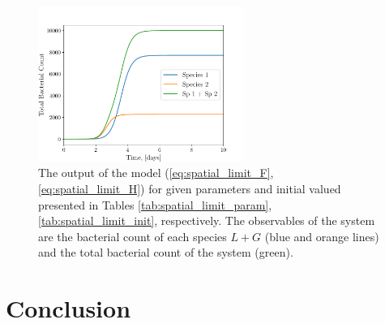 \documentclass[10pt,A4paper]{article}
\begin{document}
%
\begin{figure}[H]
    \begin{center}
    \includegraphics[width=0.6\textwidth]{Figures/pool_model_spatial.pdf}
    \caption{
        The output of the model (\ref{eq:spatial_limit_F}, \ref{eq:spatial_limit_H}) for given parameters and initial valued presented in Tables \ref{tab:spatial_limit_param}, \ref{tab:spatial_limit_init}, respectively.
        The observables of the system are the bacterial count of each species $L+G$ (blue and orange lines) and the total bacterial count of the system (green).
    }
    \label{fig:spatial_limit_plot1}
    \end{center}
\end{figure}
%
%
%
\section{Conclusion}
\newpage
\printbibliography
%
\end{document}
